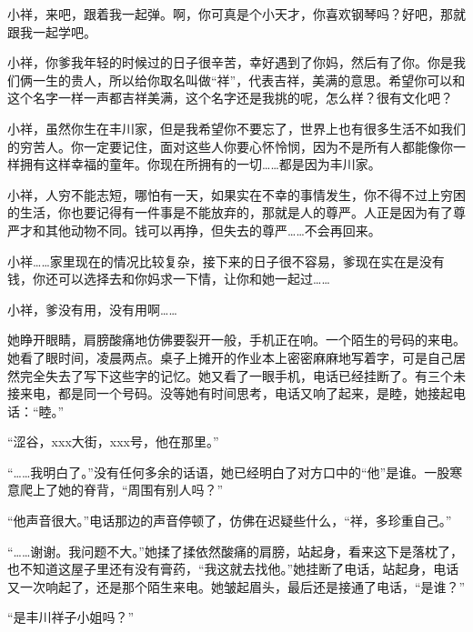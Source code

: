 \documentclass{article}
\begin{document}
小祥，来吧，跟着我一起弹。啊，你可真是个小天才，你喜欢钢琴吗？好吧，那就跟我一起学吧。



小祥，你爹我年轻的时候过的日子很辛苦，幸好遇到了你妈，然后有了你。你是我们俩一生的贵人，所以给你取名叫做“祥”，代表吉祥，美满的意思。希望你可以和这个名字一样一声都吉祥美满，这个名字还是我挑的呢，怎么样？很有文化吧？



小祥，虽然你生在丰川家，但是我希望你不要忘了，世界上也有很多生活不如我们的穷苦人。你一定要记住，面对这些人你要心怀怜悯，因为不是所有人都能像你一样拥有这样幸福的童年。你现在所拥有的一切……都是因为丰川家。



小祥，人穷不能志短，哪怕有一天，如果实在不幸的事情发生，你不得不过上穷困的生活，你也要记得有一件事是不能放弃的，那就是人的尊严。人正是因为有了尊严才和其他动物不同。钱可以再挣，但失去的尊严……不会再回来。



小祥……家里现在的情况比较复杂，接下来的日子很不容易，爹现在实在是没有钱，你还可以选择去和你妈求一下情，让你和她一起过……



小祥，爹没有用，没有用啊……



她睁开眼睛，肩膀酸痛地仿佛要裂开一般，手机正在响。一个陌生的号码的来电。她看了眼时间，凌晨两点。桌子上摊开的作业本上密密麻麻地写着字，可是自己居然完全失去了写下这些字的记忆。她又看了一眼手机，电话已经挂断了。有三个未接来电，都是同一个号码。没等她有时间思考，电话又响了起来，是睦，她接起电话：“睦。”



“涩谷，xxx大街，xxx号，他在那里。”



“……我明白了。”没有任何多余的话语，她已经明白了对方口中的“他”是谁。一股寒意爬上了她的脊背，“周围有别人吗？”



“他声音很大。”电话那边的声音停顿了，仿佛在迟疑些什么，“祥，多珍重自己。”



“……谢谢。我问题不大。”她揉了揉依然酸痛的肩膀，站起身，看来这下是落枕了，也不知道这屋子里还有没有膏药，“我这就去找他。”她挂断了电话，站起身，电话又一次响起了，还是那个陌生来电。她皱起眉头，最后还是接通了电话，“是谁？”



“是丰川祥子小姐吗？”
\end{document}
